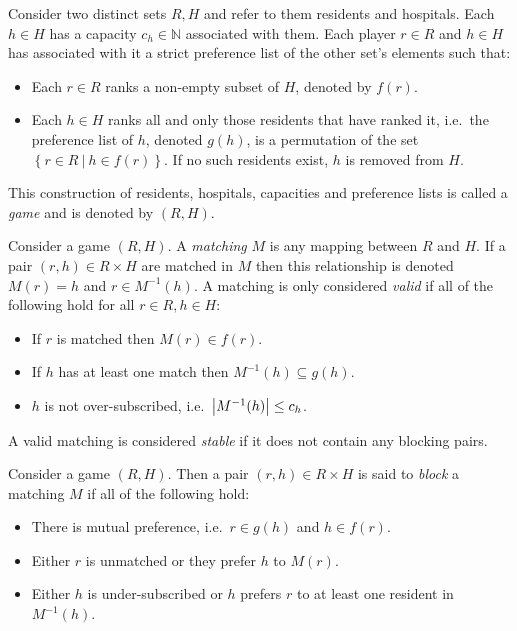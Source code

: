 \begin{definition}\label{def:game}
    Consider two distinct sets \(R, H\) and refer to them residents and
    hospitals. Each \(h \in H\) has a capacity \(c_h \in \mathbb{N}\) associated
    with them. Each player \(r \in R\) and \(h \in H\) has associated 
    with it a strict preference list of the other set's elements such that:
    \begin{itemize}
        \item Each \(r \in R\) ranks a non-empty subset of \(H\), denoted by
            \(f(r)\).
        \item Each \(h \in H\) ranks all and only those residents that have
            ranked it, i.e.\ the preference list of \(h\), denoted \(g(h)\), is
            a permutation of the set
            \(\left\{r \in R \ | \ h \in f(r)\right\}\). If no such residents
            exist, \(h\) is removed from \(H\).
    \end{itemize}
    This construction of residents, hospitals, capacities and preference lists
    is called a \emph{game} and is denoted by \((R, H)\).
\end{definition}
\begin{definition}\label{def:matching}
    Consider a game \((R, H)\). A \emph{matching} \(M\) is any mapping between
    \(R\) and \(H\). If a pair \((r, h) \in R \times H\) are matched in \(M\)
    then this relationship is denoted \(M(r) = h\) and \(r \in M^{-1}(h)\).
    A matching is only considered \emph{valid} if all of the following hold for
    all \(r \in R, h \in H\):
    \begin{itemize}
        \item If \(r\) is matched then \(M(r) \in f(r)\).
        \item If \(h\) has at least one match then \(M^{-1}(h) \subseteq g(h)\).
        \item \(h\) is not over-subscribed, i.e.\ \(\abs*{M^{-1}(h)} \leq c_h\).
    \end{itemize}
    A valid matching is considered \emph{stable} if it does not contain any
    blocking pairs.
\end{definition}
\begin{definition}\label{def:blocking}
    Consider a game \((R, H)\). Then a pair \((r, h) \in R \times H\) is said to
    \emph{block} a matching \(M\) if all of the following hold:
    \begin{itemize}
        \item There is mutual preference, i.e.\ \(r \in g(h)\) and \(h \in
            f(r)\).
        \item Either \(r\) is unmatched or they prefer \(h\) to \(M(r)\).
        \item Either \(h\) is under-subscribed or \(h\) prefers \(r\) to at
            least one resident in \(M^{-1}(h)\).
    \end{itemize}
\end{definition}


